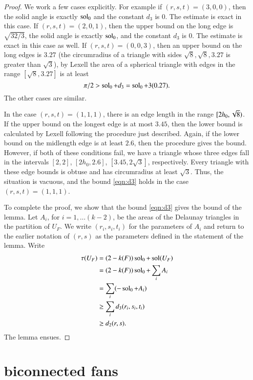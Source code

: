 \documentclass{llncs}
\begin{document}
\begin{proof}
We work a few cases explicitly.
For example if $(r,s,t)=(3,0,0)$, then the solid angle is exactly $\operatorname{sol}_0$ and the constant $d_3$ is $0$.
The estimate is exact in this case.
If $(r,s,t)=(2,0,1)$, then the upper bound on the long edge is $\sqrt{32/3}$, the solid angle is exactly
$\operatorname{sol}_0$, and the constant $d_3$ is $0$.  The estimate is exact in this case as well.
If $(r,s,t)=(0,0,3)$, then an upper bound on the long edges is $3.27$ (the circumradius of a triangle
with sides $\sqrt8,\sqrt8,3.27$ is greater than $\sqrt3$), by Lexell the area of a spherical triangle with edges
in the range $[\sqrt8,3.27]$ is at least 
\[
\pi/2 > \operatorname{sol}_0 + d_3 = \operatorname{sol}_0 + 3 (0.27).
\]
The other cases are similar.

In the case $(r,s,t)=(1,1,1)$, there is an edge length in the range $[ 2 h_0,\sqrt8)$.
If the upper bound on the longest edge is at most $3.45$, then the lower bound is calculated by Lexell
following the procedure just described.  Again, if the lower bound on the midlength edge
is at least $2.6$, then the procedure gives the bound.  However, if both of these conditions fail, we
have a triangle whose three edges fall in the intervals $[2,2]$, $[2h_0,2.6]$, $[3.45,2\sqrt3]$,
respectively.  Every
triangle with these edge bounds is obtuse and
has circumradius at least $\sqrt3$.  Thus, the situation is vacuous, and the bound \eqref{eqn:d3}
holds in the case $(r,s,t)=(1,1,1)$.


To complete the proof, we show that the bound \eqref{eqn:d3} gives the bound of the lemma.
Let $A_i$, for $i=1,\ldots (k-2)$, be the areas of the Delaunay triangles in the partition of $U_F$.
We write $(r_i,s_i,t_i)$ for the parameters of $A_i$ and return to the earlier notation of $(r,s)$ 
as the parameters defined
in the statement of the lemma.
Write
\begin{align*}
\tau(U_F) &= (2 - k(F))\operatorname{sol}_0 + \operatorname{sol}(U_F)\\ 
    &= (2 - k(F))\operatorname{sol}_0 + \sum_i A_i  \\
   &= \sum_i (-\operatorname{sol}_0 + A_i)\\
   &\ge \sum_i d_3(r_i,s_i,t_i) \\
   &\ge d_2(r,s).
\end{align*}
The lemma ensues.
\end{proof}

\section{biconnected fans}
\end{document}
